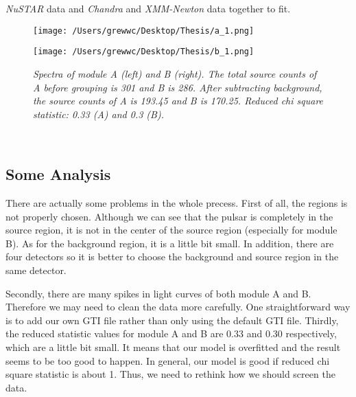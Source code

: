 \documentclass[12pt]{report}
\newcommand{\mycaption}[1]{\caption{\textit{\footnotesize #1}}}
\begin{document}
        \textit{NuSTAR} data and \textit{Chandra} and \textit{XMM-Newton} data together to fit.\\ 
        \begin{figure}[h]
          \begin{minipage}{0.45\textwidth}
            \begin{center} 
                \texttt{[image: /Users/grewwc/Desktop/Thesis/a\_1.png]}
            \end{center}
            \end{minipage}
          \begin{minipage}{0.45\textwidth}
            \begin{center}
            \texttt{[image: /Users/grewwc/Desktop/Thesis/b\_1.png]}
            \end{center}
          \end{minipage}
          \centering
          \begin{minipage}{0.8\textwidth}
          \mycaption{Spectra of module A (left) and B (right). The total source counts of A before grouping is 
                      301 and B is 286. After subtracting background, the source counts of A is 193.45 and B is
                      170.25. Reduced chi square statistic: 0.33 (A) and 0.3 (B).}
          \label{spectra}
          \end{minipage}
          \end{figure}
          \\
        \subsection*{Some Analysis}
          \indent There are actually some problems in the whole precess. First of all, the regions is not properly 
            chosen. Although we can see that the pulsar is completely in the source region, it is not in the center of 
            the source region (especially for module B). As for the background region, it is a little bit small. 
            In addition, there are four 
            detectors so it is better to choose the background and source region in the same detector. 

        \indent Secondly, there are many spikes in light curves of both module A and B. 
        Therefore we may need to clean the data
        more carefully. One straightforward way is to add our own GTI file rather than only using the default GTI 
        file. Thirdly, the reduced statistic values for module A and B are 0.33 and 0.30 respectively, which are 
        a little bit small. It means that our model is overfitted and the result seems to be too good to happen. In 
        general, our model is good if reduced chi square statistic is about 1. Thus, we need to rethink how we 
        should screen the data.
\end{document}
